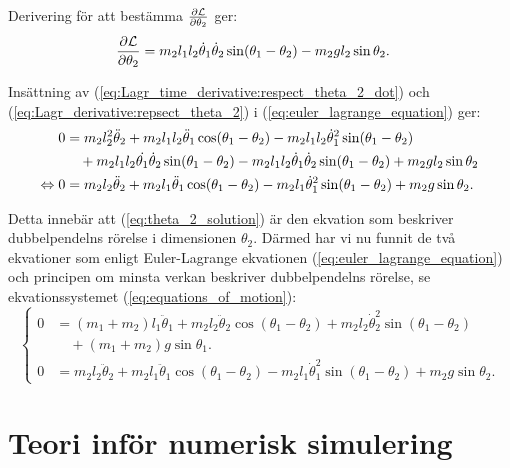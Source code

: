 Derivering för att bestämma $\frac{\partial \mathcal{L}}{\partial \theta_2}$ ger:
\begin{align}
    \frac{\partial \mathcal{L}}{\partial \theta_2} &= m_2l_1l_2\dot{\theta}_1\dot{\theta}_2\sin(\theta_1-\theta_2) - m_2gl_2\sin{\theta_2}.  \label{eq:Lagr_derivative:repsect_theta_2}
\end{align}

Insättning av (\ref{eq:Lagr_time_derivative:respect_theta_2_dot}) och (\ref{eq:Lagr_derivative:repsect_theta_2}) i (\ref{eq:euler_lagrange_equation}) ger:
\begin{align}
    0 &= m_2l_2^2\ddot{\theta}_2 + m_2l_1l_2\ddot{\theta}_1\cos(\theta_1 - \theta_2) - m_2l_1l_2\dot{\theta}_1^2\sin(\theta_1-\theta_2) \notag \\
    &\quad + m_2l_1l_2\dot{\theta_1}\dot{\theta}_2\sin(\theta_1 - \theta_2) - m_2l_1l_2\dot{\theta}_1\dot{\theta}_2\sin(\theta_1-\theta_2) + m_2gl_2\sin{\theta_2} \notag \\
    \Leftrightarrow 0 &= m_2l_2\ddot{\theta}_2 + m_2l_1\ddot{\theta}_1\cos(\theta_1 - \theta_2) - m_2l_1\dot{\theta}_1^2\sin(\theta_1 - \theta_2) + m_2g\sin{\theta_2}. \label{eq:theta_2_solution}
\end{align}

Detta innebär att (\ref{eq:theta_2_solution}) är den ekvation som beskriver dubbelpendelns rörelse i dimensionen $\theta_2$. Därmed har vi nu funnit de två ekvationer som enligt Euler-Lagrange ekvationen (\ref{eq:euler_lagrange_equation}) och principen om minsta verkan beskriver dubbelpendelns rörelse, se ekvationssystemet (\ref{eq:equations_of_motion}):
\begin{equation} \begin{cases}
        0 &= \left(m_1+m_2\right)l_1\ddot{\theta}_1 + m_2l_2\ddot{\theta}_2\cos(\theta_1-\theta_2)
        + m_2l_2\dot{\theta}_2^2\sin(\theta_1-\theta_2) \\
        &\quad + \left(m_1 + m_2\right)g\sin{\theta_1}. \\
        0 &= m_2l_2\ddot{\theta}_2 + m_2l_1\ddot{\theta}_1\cos(\theta_1 - \theta_2) - m_2l_1\dot{\theta}_1^2\sin(\theta_1 - \theta_2) + m_2g\sin{\theta_2}. \label{eq:equations_of_motion}
\end{cases} \end{equation}

\section{Teori inför numerisk simulering}

